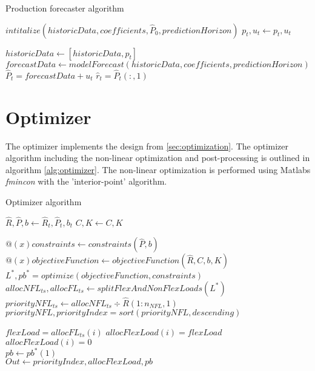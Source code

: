 \begin{algorithm}
\caption{Production forecaster algorithm}\label{alg:prod_forecast}
\begin{algorithmic}
    \State$intitalize(historicData, coefficients,\hat{P}_0,predictionHorizon) $
    \State$p_t,u_t  \gets p_t, u_t $

    \State$historicData \gets [historicData,p_t]$
    \State$forecastData \gets modelForecast(historicData,coefficients,predictionHorizon)$
\EndIf
    \State$\hat{P}_t = forecastData + u_t $
    \State$\hat{r}_t = \hat{P}_t(:,1)$
\end{algorithmic}
\end{algorithm}



\section{Optimizer}
The optimizer implements the design from \ref{sec:optimization}. The optimizer algorithm including the non-linear optimization and post-processing is outlined in algorithm \ref{alg:optimizer}. The non-linear optimization is performed using Matlabs \textit{fmincon} with the 'interior-point' algorithm.

\begin{algorithm}
\caption{Optimizer algorithm}\label{alg:optimizer}
\begin{algorithmic}
    \State$\hat{R},\hat{P},b  \gets \hat{R}_t,\hat{P}_t,b_t$ 
    \State$C, K \gets C, K $
    
    \State$@(x)constraints \gets constraints(\hat{P},b)$
    \State$@(x)objectiveFunction \gets objectiveFunction(\hat{R},C,b,K)$
    \State$L^*,pb^* = optimize(objectiveFunction, constraints)$
    \State$allocNFL_{ts},allocFL_{ts} \gets splitFlexAndNonFlexLoads(L^*)$
    \\
    \State$priorityNFL_{ts} \gets allocNFL_{ts}\div\hat{R}(1:n_{NFL},1)$
    \State$priorityNFL,priorityIndex = sort(priorityNFL,descending)$

        \State$flexLoad = allocFL_{ts}(i) $
            \State$allocFlexLoad(i) = flexLoad$
        \Else
            \State$allocFlexLoad(i) = 0$
        \EndIf
    \EndFor\\
    
    \State$pb \gets pb^*(1)$\\

    \State  $Out \gets priorityIndex,  allocFlexLoad,  pb$
\EndIf
\end{algorithmic}
\end{algorithm}

